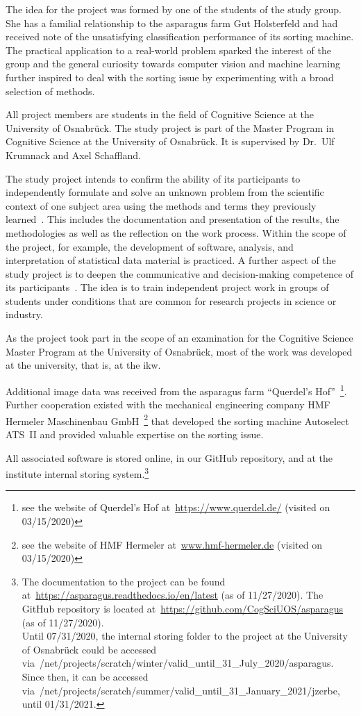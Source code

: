 The idea for the project was formed by one of the students of the study group. She has a familial relationship to the asparagus farm Gut Holsterfeld and had received note of the unsatisfying classification performance of its sorting machine. The practical application to a real-world problem sparked the interest of the group and the general curiosity towards computer vision and machine learning further inspired to deal with the sorting issue by experimenting with a broad selection of methods.

All project members are students in the field of Cognitive Science at the University of Osnabr{\"u}ck. The study project is part of the Master Program in Cognitive Science at the University of Osnabr{\"u}ck. It is supervised by Dr.\ Ulf Krumnack and Axel Schaffland.

The study project intends to confirm the ability of its participants to independently formulate and solve an unknown problem from the scientific context of one subject area using the methods and terms they previously learned~\citep{moduledescription,studyregulations}. This includes the documentation and presentation of the results, the methodologies as well as the reflection on the work process. Within the scope of the project, for example, the development of software, analysis, and interpretation of statistical data material is practiced. A further aspect of the study project is to deepen the communicative and decision-making competence of its participants~\citep{moduledescription}. The idea is to train independent project work in groups of students under conditions that are common for research projects in science or industry.

As the project took part in the scope of an examination for the Cognitive Science Master Program at the University of Osnabr{\"u}ck, most of the work was developed at the university, that is, at the \acrfull{ikw}.

Additional image data was received from the asparagus farm \enquote{Querdel’s Hof}~\footnote{see the website of Querdel’s Hof at~\url{https://www.querdel.de/} (visited on 03/15/2020)}. Further cooperation existed with the mechanical engineering company HMF Hermeler Maschinenbau GmbH~\footnote{see the website of HMF Hermeler at~\url{www.hmf-hermeler.de} (visited on 03/15/2020)} that developed the sorting machine Autoselect ATS~II and provided valuable expertise on the sorting issue.

All associated software is stored online, in our GitHub repository, and at the institute internal storing system.\footnote{The documentation to the project can be found at~\url{https://asparagus.readthedocs.io/en/latest} (as of 11/27/2020). The GitHub repository is located at~\url{https://github.com/CogSciUOS/asparagus} (as of 11/27/2020). \\ Until 07/31/2020, the internal storing folder to the project at the University of Osnabr{\"u}ck could be accessed via~/net/projects/scratch/winter/valid\_until\_31\_July\_2020/asparagus. Since then, it can be accessed via~/net/projects/scratch/summer/valid\_until\_31\_January\_2021/jzerbe, until 01/31/2021.}


